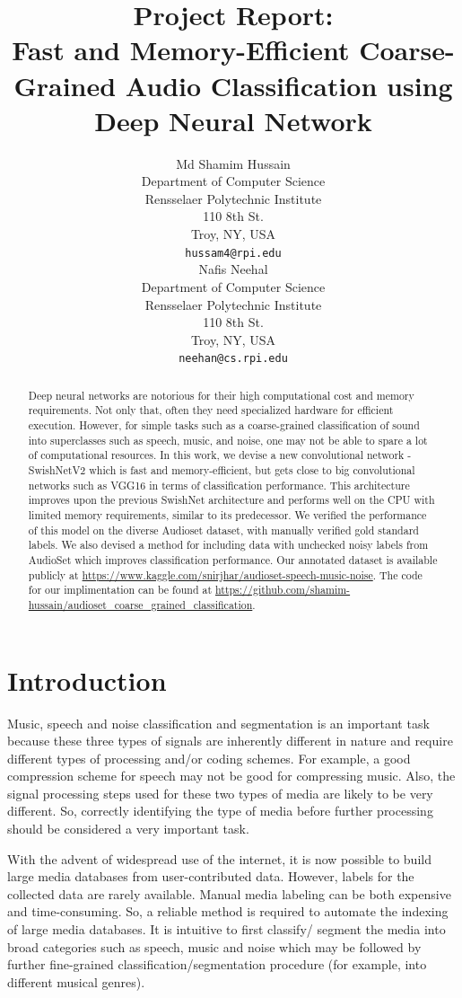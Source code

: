 \documentclass{article}
\title{Project Report:\\Fast and Memory-Efficient Coarse-Grained Audio Classification using Deep Neural Network}
\author{
Md Shamim Hussain\\
Department of Computer Science\\
Rensselaer Polytechnic Institute\\
110 8th St.\\ Troy, NY, USA\\
\texttt{hussam4@rpi.edu} \\
\And
Nafis Neehal\\
Department of Computer Science\\
Rensselaer Polytechnic Institute\\
110 8th St.\\ Troy, NY, USA\\
\texttt{neehan@cs.rpi.edu} \\
}
\begin{document}
\maketitle

\begin{abstract}
  Deep neural networks are notorious for their high computational cost and memory requirements. Not only that, often they need specialized hardware for efficient execution. However, for simple tasks such as a coarse-grained classification of sound into superclasses such as speech, music, and noise, one may not be able to spare a lot of computational resources. In this work, we devise a new convolutional network - SwishNetV2 which is fast and memory-efficient, but gets close to big convolutional networks such as VGG16 in terms of classification performance. This architecture improves upon the previous SwishNet architecture and performs well on the CPU with limited memory requirements, similar to its predecessor. We verified the performance of this model on the diverse Audioset dataset, with manually verified gold standard labels. We also devised a method for including data with unchecked noisy labels from AudioSet which improves classification performance. Our annotated dataset is available publicly at \url{https://www.kaggle.com/snirjhar/audioset-speech-music-noise}. The code for our implimentation can be found at \url{https://github.com/shamim-hussain/audioset_coarse_grained_classification}.
\end{abstract}

\section{Introduction}
Music, speech and noise classification and segmentation is an important task because these three types of signals are inherently different in nature \cite{Wolfe2002} and require different types of processing and/or coding schemes. For example, a good compression scheme for speech may not be good for compressing music. Also, the signal processing steps used for these two types of media are likely to be very different. So, correctly identifying the type of media before further processing should be considered a very important task. 

With the advent of widespread use of the internet, it is now possible to build large media databases from user-contributed data. However, labels for the collected data are rarely available. Manual media labeling can be both expensive and time-consuming. So, a reliable method is required to automate the indexing of large media databases. It is intuitive to first classify/ segment the media into broad categories such as speech, music and noise which may be followed by further fine-grained classification/segmentation procedure (for example, into different musical genres). 
\end{document}
